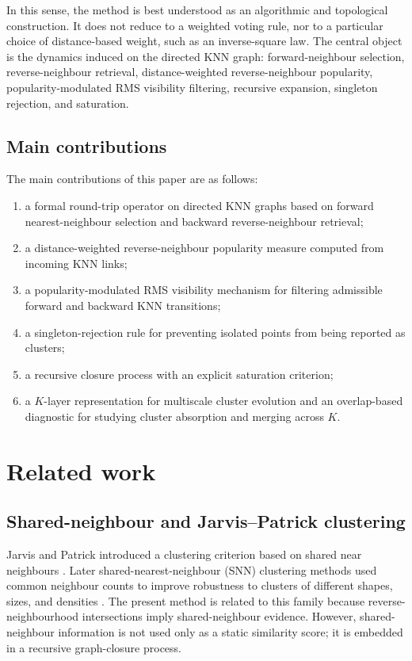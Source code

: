 \documentclass[pdflatex,sn-mathphys-num]{sn-jnl}
\begin{document}
In this sense, the method is best understood as an algorithmic and topological construction. It does not reduce to a weighted voting rule, nor to a particular choice of distance-based weight, such as an inverse-square law. The central object is the dynamics induced on the directed KNN graph: forward-neighbour selection, reverse-neighbour retrieval, distance-weighted reverse-neighbour popularity, popularity-modulated RMS visibility filtering, recursive expansion, singleton rejection, and saturation.

\subsection{Main contributions}

The main contributions of this paper are as follows:
\begin{enumerate}
\item a formal round-trip operator on directed KNN graphs based on forward nearest-neighbour selection and backward reverse-neighbour retrieval;
\item a distance-weighted reverse-neighbour popularity measure computed from incoming KNN links;
\item a popularity-modulated RMS visibility mechanism for filtering admissible forward and backward KNN transitions;
\item a singleton-rejection rule for preventing isolated points from being reported as clusters;
\item a recursive closure process with an explicit saturation criterion;
\item a $K$-layer representation for multiscale cluster evolution and an overlap-based diagnostic for studying cluster absorption and merging across $K$.
\end{enumerate}

\section{Related work}\label{sec:related}

\subsection{Shared-neighbour and Jarvis--Patrick clustering}

Jarvis and Patrick introduced a clustering criterion based on shared near neighbours \citep{JarvisPatrick1973}. Later shared-nearest-neighbour (SNN) clustering methods used common neighbour counts to improve robustness to clusters of different shapes, sizes, and densities \citep{Ertoz2003SNN}. The present method is related to this family because reverse-neighbourhood intersections imply shared-neighbour evidence. However, shared-neighbour information is not used only as a static similarity score; it is embedded in a recursive graph-closure process.
\end{document}
